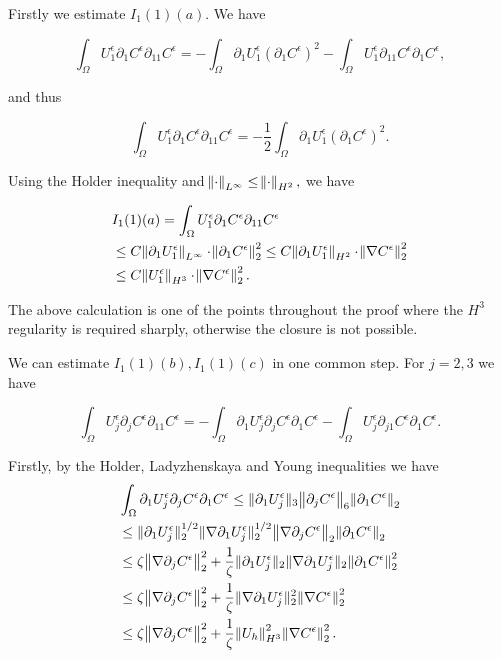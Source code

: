 \documentclass[11pt]{article}
\begin{document}
Firstly we estimate $I_1(1)(a).$ We have

$$ \int_\Omega U_1^\epsilon \partial_1 C^\epsilon \partial_{11} C^\epsilon = - \int_\Omega \partial_1 U_1^\epsilon (\partial_1 C^\epsilon)^2 - \int_\Omega U_1^\epsilon \partial_{11} C^\epsilon \partial_1 C^\epsilon,$$

and thus

$$\int_\Omega U_1^\epsilon \partial_1 C^\epsilon \partial_{11} C^\epsilon = - \frac{1}{2} \int_\Omega \partial_1 U_1^\epsilon (\partial_1 C^\epsilon)^2.$$

Using the Holder inequality and $\norm{\cdot}_{L^\infty} \leq \norm{\cdot}_{H^2},$ we have

\begin{equation}
  \begin{split}
    & I_1(1)(a) = \int_\Omega U_1^\epsilon \partial_1 C^\epsilon \partial_{11} C^\epsilon \\
    & \leq C \norm{\partial_1 U_1^\epsilon}_{L^\infty} \cdot \norm{\partial_1 C^\epsilon}_2^2 \leq C \norm{\partial_1 U_1^\epsilon}_{H^2} \cdot \norm{\nabla C^\epsilon}_2^2 \\
    & \leq C \norm{U_1^\epsilon}_{H^3} \cdot \norm{\nabla C^\epsilon}_2^2.
  \end{split}
\end{equation}

The above calculation is one of the points throughout the proof where the $H^3$ regularity is required sharply, otherwise the closure is not possible. 

We can estimate $I_1(1)(b), I_1(1)(c)$ in one common step. For $j = 2,3$ we have

$$ \int_\Omega U_j^\epsilon \partial_j C^\epsilon \partial_{11} C^\epsilon = - \int_\Omega \partial_1 U_j^\epsilon \partial_j C^\epsilon \partial_1 C^\epsilon - \int_\Omega U_j^\epsilon \partial_{j1} C^\epsilon \partial_1 C^\epsilon.$$

Firstly, by the Holder, Ladyzhenskaya and Young inequalities we have
\begin{equation}
  \begin{split}
    & \int_\Omega \partial_1 U_j^\epsilon \partial_j C^\epsilon \partial_1 C^\epsilon \leq \| \partial_1 U_j^\epsilon \| _3 \norm{\partial_j C^\epsilon}_6 \norm{\partial_1 C^\epsilon}_2 \\
    & \leq \| \partial_1 U_j^\epsilon \|_2^{1/2} \|\nabla \partial_1 U_j^\epsilon \|_2^{1/2} \norm{\nabla \partial_j C^\epsilon}_2 \norm{\partial_1 C^\epsilon}_2 \\
    & \leq \zeta \norm{\nabla \partial_j C^\epsilon}_2^2 + \frac{1}{\zeta} \| \partial_1 U_j^\epsilon \|_2 \|\nabla \partial_1 U_j^\epsilon \|_2 \norm{\partial_1 C^\epsilon}_2^2 \\
    & \leq \zeta \norm{\nabla \partial_j C^\epsilon}_2^2 + \frac{1}{\zeta} \|\nabla \partial_1 U_j^\epsilon \|_2^2 \norm{\nabla C^\epsilon}_2^2 \\
    & \leq \zeta \norm{\nabla \partial_j C^\epsilon}_2^2 + \frac{1}{\zeta} \norm{U_h}_{H^3}^2 \norm{\nabla C^\epsilon}_2^2.
  \end{split}
\end{equation}
\end{document}
